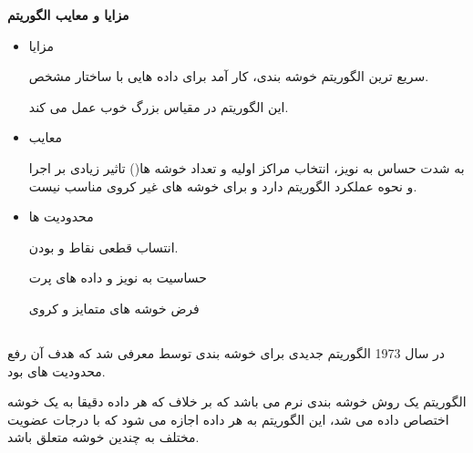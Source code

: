 \documentclass[10pt]{beamer}
\begin{document}
\begin{frame}{}
\textbf{مزایا و معایب 
الگوریتم 
}

\begin{itemize}
\item{مزایا}

سریع ترین الگوریتم خوشه بندی، کار آمد برای داده هایی با ساختار مشخص.

این الگوریتم در مقیاس بزرگ خوب عمل می کند.
\item {معایب}

به شدت حساس به نویز، انتخاب مراکز اولیه و تعداد خوشه ها() تاثیر زیادی بر اجرا و نحوه عملکرد الگوریتم دارد و برای خوشه های غیر کروی مناسب نیست.

\item {محدودیت ها}

انتساب قطعی نقاط و  بودن.

حساسیت به نویز و داده های پرت

فرض خوشه های متمایز و کروی 
\end{itemize}
\end{frame}	
	
	
\begin{frame}{}
	\section{}
در سال 1973 الگوریتم جدیدی برای خوشه بندی توسط  معرفی شد که هدف آن رفع محدودیت های  بود.

الگوریتم  یک روش خوشه بندی نرم می باشد که بر خلاف  که هر داده دقیقا به یک خوشه اختصاص داده می شد، این الگوریتم به هر داده اجازه می شود که با درجات عضویت مختلف  به چندین خوشه متعلق باشد.
\end{frame}	
	
\end{document}
